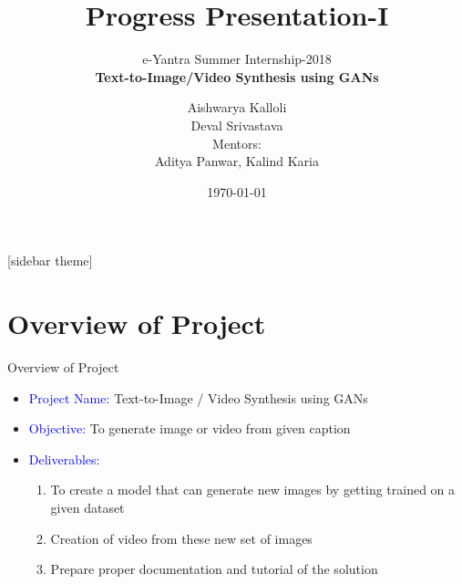 \documentclass[10pt, a4paper]{beamer}
\begin{document}
	\title{Progress Presentation-I}
	\subtitle{e-Yantra Summer Internship-2018 \\ $ $\textbf{Text-to-Image/Video Synthesis using GANs}$ $}
	\author{Aishwarya Kalloli\\Deval Srivastava\\ \vspace{1em}
	Mentors:\\ Aditya Panwar, Kalind Karia}
	\date{\today}
	\frame{\titlepage}

[sidebar theme]
\section{Overview of Project}
\begin{frame}{Overview of Project}
	\begin{itemize}
		\item \textcolor{blue}{Project Name:} Text-to-Image / Video Synthesis using GANs
		\item \textcolor{blue}{Objective:} To generate image or video from given caption
		\item \textcolor{blue}{Deliverables:}
    		\begin{enumerate}
    		    \item To create a model that can generate new images by getting trained on a given dataset
    		    \item Creation of video from these new set of images
    		    \item Prepare proper documentation and tutorial of the solution
    		\end{enumerate}
	\end{itemize}
\end{frame}
\end{document}
